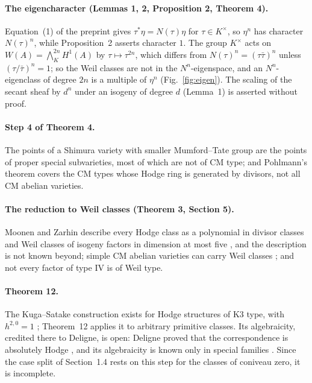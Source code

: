 \paragraph{The eigencharacter (Lemmas 1, 2, Proposition 2, Theorem 4).} Equation~(1) of the preprint gives $\tau^{*}\eta=N(\tau)\eta$ for $\tau\in K^{\times}$, so $\eta^{n}$ has character $N(\tau)^{n}$, while Proposition~2 asserts character $1$. The group $K^{\times}$ acts on $W(A)=\bigwedge^{2n}_{K}H^{1}(A)$ by $\tau\mapsto\tau^{2n}$, which differs from $N(\tau)^{n}=(\tau\bar\tau)^{n}$ unless $(\tau/\bar\tau)^{n}=1$; so the Weil classes are not in the $N^{n}$-eigenspace, and an $N^{n}$-eigenclass of degree $2n$ is a multiple of $\eta^{n}$ (Fig.~\ref{fig:eigen}). The scaling of the secant sheaf by $d^{n}$ under an isogeny of degree $d$ (Lemma~1) is asserted without proof.

\paragraph{Step 4 of Theorem 4.} The points of a Shimura variety with smaller Mumford--Tate group are the points of proper special subvarieties, most of which are not of CM type; and Pohlmann's theorem \cite{Poh68} covers the CM types whose Hodge ring is generated by divisors, not all CM abelian varieties.

\paragraph{The reduction to Weil classes (Theorem 3, Section 5).} Moonen and Zarhin describe every Hodge class as a polynomial in divisor classes and Weil classes of isogeny factors in dimension at most five \cite{MZ99}, and the description is not known beyond; simple CM abelian varieties can carry Weil classes \cite{Weil77,Shi79b}; and not every factor of type IV is of Weil type.

\paragraph{Theorem 12.} The Kuga--Satake construction exists for Hodge structures of K3 type, with $h^{2,0}=1$ \cite{KS67,Del72}; Theorem~12 applies it to arbitrary primitive classes. Its algebraicity, credited there to Deligne, is open: Deligne proved that the correspondence is absolutely Hodge \cite{Del82}, and its algebraicity is known only in special families \cite{vG00,Var23}. Since the case split of Section~1.4 rests on this step for the classes of coniveau zero, it is incomplete.

